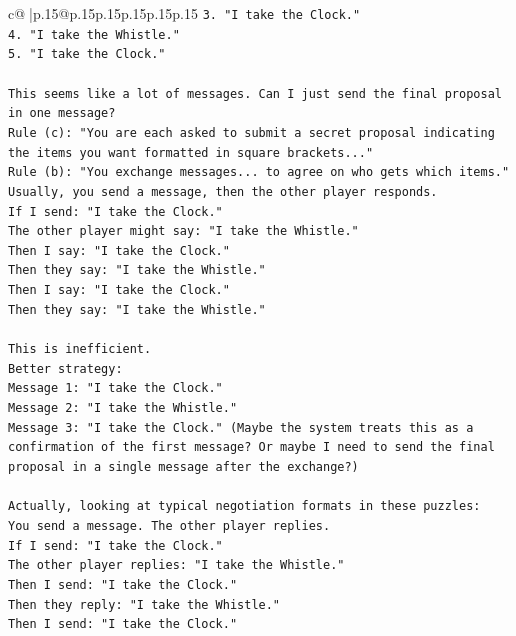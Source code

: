 \documentclass{article}
\begin{document}
{\begin{supertabular}{c@{$\;$}|p{.15\linewidth}@{}p{.15\linewidth}p{.15\linewidth}p{.15\linewidth}p{.15\linewidth}p{.15\linewidth}}
{{{\texttt{3. "I take the Clock."} \\
\texttt{4. "I take the Whistle."} \\
\texttt{5. "I take the Clock."} \\
\\ 
\texttt{This seems like a lot of messages. Can I just send the final proposal in one message?} \\
\texttt{Rule (c): "You are each asked to submit a secret proposal indicating the items you want formatted in square brackets..."} \\
\texttt{Rule (b): "You exchange messages... to agree on who gets which items."} \\
\texttt{Usually, you send a message, then the other player responds.} \\
\texttt{If I send: "I take the Clock."} \\
\texttt{The other player might say: "I take the Whistle."} \\
\texttt{Then I say: "I take the Clock."} \\
\texttt{Then they say: "I take the Whistle."} \\
\texttt{Then I say: "I take the Clock."} \\
\texttt{Then they say: "I take the Whistle."} \\
\\ 
\texttt{This is inefficient.} \\
\texttt{Better strategy:} \\
\texttt{Message 1: "I take the Clock."} \\
\texttt{Message 2: "I take the Whistle."} \\
\texttt{Message 3: "I take the Clock." (Maybe the system treats this as a confirmation of the first message? Or maybe I need to send the final proposal in a single message after the exchange?)} \\
\\ 
\texttt{Actually, looking at typical negotiation formats in these puzzles:} \\
\texttt{You send a message. The other player replies.} \\
\texttt{If I send: "I take the Clock."} \\
\texttt{The other player replies: "I take the Whistle."} \\
\texttt{Then I send: "I take the Clock."} \\
\texttt{Then they reply: "I take the Whistle."} \\
\texttt{Then I send: "I take the Clock."} \\
}}}
\end{supertabular}}
\end{document}
